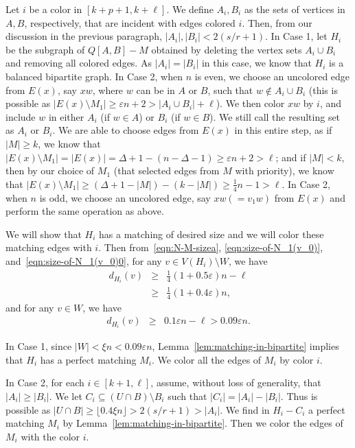 \documentclass[11pt, oneside]{article}
\newcommand{\ve}{\varepsilon}
\begin{document}
Let $i$ be a color in $[k+p+1,k+\ell]$. We define $A_i, B_i$ as the sets of vertices in $A, B$, respectively, that are incident with edges colored $i$. 
Then, from our discussion in the previous paragraph, $|A_i|,|B_i| < 2 (s/r+1)$. 
In Case 1, 
let $H_i$ be the subgraph of $Q[A, B]-M$ obtained by
deleting the vertex sets $A_i \cup B_i$ and removing all colored edges. As $|A_i|=|B_i|$ in this case, we know that $H_i$
is a balanced bipartite graph. 
In Case 2, when $n$ is even, we  choose an uncolored edge from $E(x)$, say $xw$,
where $w$ can be in $A$ or $B$, such that $w\not\in A_i\cup B_i$ (this is possible as $|E(x) \setminus M_1| \ge \ve n+2> |A_i\cup B_i| +\ell$). We then color $xw$ by $i$,
and include $w$ in either $A_i$ (if $w\in A$) or $B_i$ (if $w\in B$).  We still call the resulting set as $A_i$ or $B_i$.  We are able to choose edges from $E(x)$ 
in this entire step, as 
if $|M| \ge k$, 
we know that $|E(x)\setminus M_1| =|E(x)| =\Delta+1-(n-\Delta-1) \ge \ve n+2 >\ell$;  
and if $|M|<k$, then   
 by our choice of $M_1$ (that selected edges from $M$ with priority), we know that 
$
    |E(x)\setminus M_1| \ge  (\Delta+1-|M|) -(k-|M|) \ge \frac{1}{4}n-1>\ell. 
$
In Case 2, when $n$ is odd, we  choose an uncolored edge, say $xw (=v_1w)$ from $E(x)$ and perform the same operation as above. 

We will show that $H_i$ has a  matching of desired size and we will color these matching edges with $i$.
Then from~\eqref{eqn:N-M-sizea}, \eqref{eqn:size-of-N_1(v_0)},  and~\eqref{eqn:size-of-N_1(v_0)0},
for any $v\in V(H_i)\setminus W$, we have 
\begin{eqnarray}
d_{H_i}(v)  & \ge& \tfrac{1}{4}(1+0.5\ve) n -\ell \nonumber  \\
 &\ge & \tfrac{1}{4}(1+0.4\ve) n,  \nonumber  
\end{eqnarray}
and for any  $v\in W$, we have 
\begin{eqnarray} 
d_{H_i}(v)  & \ge&   0.1\ve n -\ell >0.09\ve n.\nonumber 
\end{eqnarray}

In Case 1,  
since $|W|< \xi n <0.09 \ve n$, Lemma~\ref{lem:matching-in-bipartite} implies that 
$H_i$ has a perfect matching $M_i$. We color all the edges of $M_i$
by color $i$. 


 


In Case 2,  for each $i\in [k+1, \ell]$, assume, without loss of generality, that $|A_i| \ge |B_i|$. 
We let $C_i\subseteq (U\cap B)\setminus B_i$ such that  $|C_i| =|A_i|-|B_i|$. Thus is possible as $|U\cap B| \ge \lfloor 0.4\xi n \rfloor >2(s/r+1) >|A_i|$.  
We find in $H_i-C_i$ a 
 perfect matching $M_i$ by Lemma~\ref{lem:matching-in-bipartite}. 
Then we color the edges of $M_i$ with the color $i$. 
\end{document}

